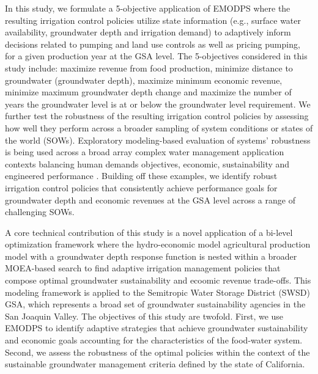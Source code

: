 \documentclass[a4paper,fleqn]{cas-sc}
\begin{document}
In this study, we formulate a 5-objective application of EMODPS where the resulting irrigation control policies utilize state information (e.g., surface water availability, groundwater depth and irrigation demand) to adaptively inform decisions related to pumping and land use controls as well as pricing pumping, for a given production year at the GSA level. The 5-objectives considered in this study include: maximize revenue from food production, minimize distance to groundwater (groundwater depth), maximize minimum economic revenue, minimize maximum groundwater depth change and maximize the number of years the groundwater level is at or below the groundwater level requirement. We further test the robustness of the resulting irrigation control policies \citep{groves_robust_2019,lempert_making_2013,kasprzyk_many_2013} by assessing how well they perform across a broader sampling of system conditions or states of the world (SOWs). Exploratory modeling-based evaluation of systems' robustness is being used across a broad array complex water management application contexts balancing human demands objectives, economic, sustainability and engineered performance \citep{graveline_combining_2020,huskova_screening_2016,miro_adaptive_2021,hadjimichael_defining_2020,shuai_robust_2022,moallemi_exploratory_2020,bertoni_discovering_2019,quinn_exploring_2018,trindade_deeply_2019,shuai_robust_2022}. Building off these examples, we identify robust irrigation control policies that consistently achieve performance goals for groundwater depth and economic revenues at the GSA level across a range of challenging SOWs. 

A core technical contribution of this study is a novel application of a bi-level optimization framework where the hydro-economic model agricultural production model with a groundwater depth response function is nested within a broader MOEA-based search to find adaptive irrigation management policies that compose optimal groundwater sustainability and ecoomic revenue trade-offs. This modeling framework is applied to the Semitropic Water Storage District (SWSD) GSA, which represents a broad set of groundwater sustainability agencies in the San Joaquin Valley. The objectives of this study are twofold. First, we use EMODPS to identify adaptive strategies that achieve groundwater sustainability and economic goals accounting for the characteristics of the food-water system. Second, we assess the robustness of the optimal policies within the context of the sustainable groundwater management criteria defined by the state of California.
\end{document}
